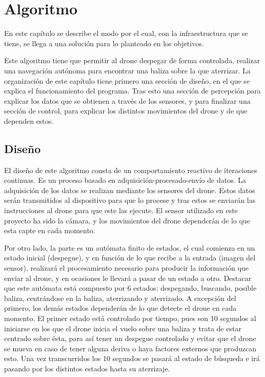 \chapter{Algoritmo}\label{cap.algoritmo}

\hspace{1 cm} En este cap\'itulo se describe el modo por el cual, con la infraestructura que se tiene, se llega a una soluci\'on para lo planteado en los objetivos. 

\hspace{1 cm} Este algoritmo tiene que permitir al drone despegar de forma controlada, realizar una navegaci\'on aut\'onoma para encontrar una baliza sobre la que aterrizar. La organizaci\'on de este cap\'itulo tiene primero una secci\'on de diseño, en el que se explica el funcionamiento del programa. Tras esto una secci\'on de percepci\'on para explicar los datos que se obtienen a trav\'es de los sensores, y para finalizar una secci\'on de control, para explicar los distintos movimientos del drone y de que dependen estos.

\section{Diseño}
\label{sec.Design}

\hspace{1 cm} El diseño de este algoritmo consta de un comportamiento reactivo de iteraciones continuas. Es un proceso basado en adquisici\'on-procesado-env\'io de datos. La adquisici\'on de los datos se realizan mediante los sensores del drone. Estos datos ser\'an transmitidos al dispositivo para que lo procese y tras estos se enviar\'an las instrucciones al drone para que este las ejecute. El sensor utilizado en este proyecto ha sido la c\'amara, y los movimientos del drone depender\'an de lo que esta capte en cada momento. 

\hspace{1 cm} Por otro lado, la parte es un aut\'omata finito de estados, el cual comienza en un estado inicial (despegue), y en funci\'on de lo que recibe a la entrada (imagen del sensor), realizar\'a el procesamiento necesario para producir la informaci\'on que enviar al drone, y en ocasiones le llevar\'a a pasar de un estado a otro. Destacar que este aut\'omata est\'a compuesto por 6 estados: despegando, buscando, posible baliza, centr\'andose en la baliza, aterrizando y aterrizado. A excepci\'on del primero, los dem\'as estados depender\'an de lo que detecte el drone en cada momento. El primer estado est\'a controlado por tiempo, pues son 10 segundos al iniciarse en los que el drone inicia el vuelo sobre una baliza y trata de estar centrado sobre \'esta, para as\'i tener un despegue controlado y evitar que el drone se mueva en caso de tener alguna deriva o haya factores externos que produzcan esto. Una vez transcurridos los 10 segundos se pasar\'a al estado de b\'usqueda e ir\'a pasando por los distintos estados hasta su aterrizaje. 

